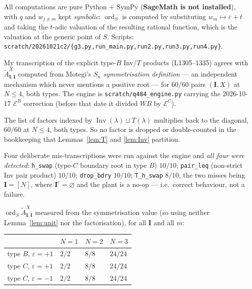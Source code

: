 \documentclass[11pt]{article}
\theoremstyle{definition}
\theoremstyle{remark}
\DeclareMathOperator{\Inv}{Inv}
\DeclareMathOperator{\ord}{ord}
\newcommand{\At}{\widetilde{A}}
\newcommand{\bI}{\mathbf{I}}
\begin{document}
All computations are pure Python $+$ SymPy (\textbf{SageMath is not installed}), with
$q$ and $w_{j\ne m}$ kept \emph{symbolic}: $\ord_S$ is computed by substituting
$w_m\mapsto\varepsilon+t$ and taking the $t$-adic valuation of the resulting rational
function, which is the valuation at the generic point of $S$.  Scripts:
\texttt{scratch/20261021c2/\{g3.py,run\_main.py,run2.py,run3.py,run4.py\}}.

\begin{description}[leftmargin=1.4em]
\item[Control 1 --- the transcription.]  My transcription of the explicit type-$B$
  Inv/$T$ products (L1305--1335) agrees with $\At^{X}_{\bI,\bI}$ computed from Motegi's
  \emph{$S_n$ symmetrisation definition} --- an independent mechanism which never
  mentions a positive root --- for \textbf{$60/60$} pairs $(\bI,X)$ at $N\le4$, both
  types.  The engine is \texttt{scratch/q484\_engine.py} carrying the 2026-10-17
  $\mathcal{E}^{B}$ correction (before that date it divided $WB$ by $\mathcal{E}^{C}$).
\item[Control 2 --- the factor list.]  The list of factors indexed by
  $\Inv(\lambda)\sqcup T(\lambda)$ multiplies back to the diagonal, $60/60$ at $N\le4$,
  both types.  So no factor is dropped or double-counted in the bookkeeping that
  Lemmas~\ref{lem:T} and \ref{lem:Inv} partition.
\item[Control 3 --- the instrument is sensitive.]  Four deliberate mis-transcriptions
  were run against the engine and \emph{all four were detected}: \texttt{h\_swap}
  (type-$C$ boundary root in type $B$) $10/10$; \texttt{pair\_leq} (non-strict Inv pair
  product) $10/10$; \texttt{drop\_bdry} $10/10$; \texttt{T\_h\_swap} $8/10$, the two
  misses being $\bI=[N]$, where $\bI^{c}=\varnothing$ and the plant is a no-op --- i.e.\
  correct behaviour, not a failure.
\item[Measurement A --- the theorem.]  $\ord_S\At^{X}_{\bI,\bI}$ measured from the
  symmetrisation value (so using neither Lemma~\ref{lem:unit} nor the factorisation),
  for all $\bI$ and all $m$:
  \begin{center}
  \begin{tabular}{llll}
   & $N=1$ & $N=2$ & $N=3$\\\hline
   type $B$, $\varepsilon=+1$ & $2/2$ & $8/8$ & $24/24$\\
   type $C$, $\varepsilon=+1$ & $2/2$ & $8/8$ & $24/24$\\
   type $C$, $\varepsilon=-1$ & $2/2$ & $8/8$ & $24/24$\\

\end{tabular}
\end{center}
\end{description}
\end{document}
